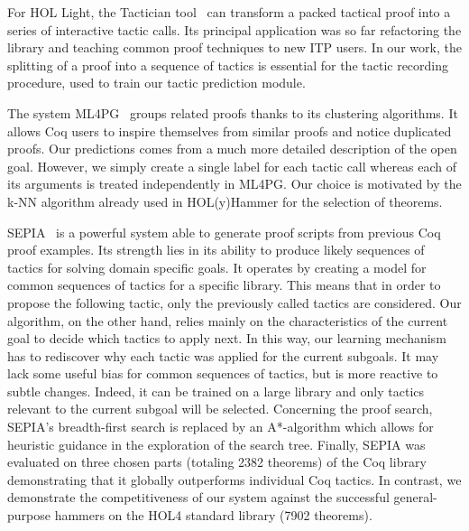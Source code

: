 \documentclass[runningheads,a4paper,draft]{svjour3}
\def\holfour{\textsf{HOL4}\xspace}
\def\hollight{\textsf{HOL Light}\xspace}
\def\coq{\textsf{Coq}\xspace}
\def\holyhammer{\textsf{HOL(y)Hammer}\xspace}
\begin{document}
For \hollight, the Tactician tool~\cite{DBLP:conf/sefm/Adams15} 
can transform a packed tactical proof into a series of interactive tactic 
calls. Its principal application 
was so far refactoring the library and teaching common proof techniques to new 
ITP users. In our work, the splitting of a proof into a sequence of tactics is 
essential for the
tactic recording procedure, used to train our tactic prediction module.

The system \textsf{ML4PG}~\cite{DBLP:journals/corr/abs-1212-3618,DBLP:journals/mics/HerasK14} 
groups related proofs thanks to its clustering 
algorithms. It allows \coq users to inspire themselves from similar proofs and 
notice 
duplicated proofs. Our predictions comes from a much more detailed description 
of the open goal.
However, we simply create a single label for each tactic call whereas each of 
its
arguments is treated independently in \textsf{ML4PG}. 
Our choice is motivated by the k-NN algorithm already used in
\holyhammer for the selection of theorems.

\textsf{SEPIA}~\cite{DBLP:conf/cade/GransdenWR15} is a powerful system able to 
generate
proof scripts from previous \coq proof examples.
Its strength lies in its ability to produce likely sequences 
of tactics for solving domain specific goals. It operates by creating a model 
for common sequences of tactics for a specific library.
This means that in order to propose the following tactic, only the previously 
called tactics
are considered.
Our algorithm, on the other hand, relies mainly on the characteristics of the 
current goal 
to decide
which tactics to apply next. In this way, our learning mechanism has to 
rediscover why each 
tactic was applied for the current subgoals. It may lack some useful bias for 
common sequences 
of tactics, but is more reactive to subtle changes. Indeed, it can be trained 
on a large library and only tactics relevant to the current subgoal will be 
selected. 
Concerning the proof search, \textsf{SEPIA}'s %
breadth-first search is replaced by an A*-algorithm which allows for heuristic 
guidance in 
the exploration of the search tree.
Finally, \textsf{SEPIA} was evaluated on three chosen parts (totaling 2382 
theorems) of the 
\coq library demonstrating that it globally outperforms individual \coq 
tactics. In contrast, we demonstrate the competitiveness of our system against 
the successful general-purpose hammers on the \holfour standard library (7902 
theorems).
\end{document}
